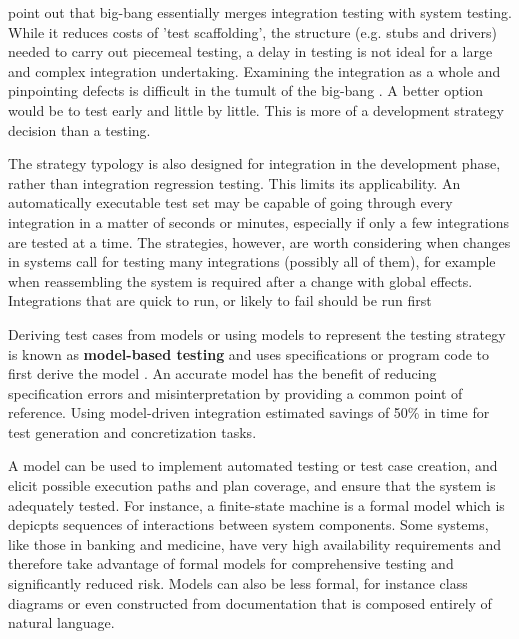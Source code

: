 \documentclass[12pt,a4paper,oneside,pdftex]{report}
\begin{document}
\citet{pezze2008software} point out that big-bang essentially merges integration testing with system testing. While it reduces costs of 'test scaffolding', the structure (e.g. stubs and drivers) needed to carry out piecemeal testing, a delay in testing is not ideal for a large and complex integration undertaking. Examining the integration as a whole and pinpointing defects is difficult in the tumult of the big-bang \citep{myers1976software, pezze2008software}. A better option would be to test early and little by little. This is more of a development strategy decision than a testing.

The strategy typology is also designed for integration in the development phase, rather than integration regression testing. This limits its applicability. An automatically executable test set may be capable of going through every integration in a matter of seconds or minutes, especially if only a few integrations are tested at a time. The strategies, however, are worth considering when changes in systems call for testing many integrations (possibly all of them), for example when reassembling the system is required after a change with global effects. Integrations that are quick to run, or likely to fail should be run first \citep{duvall2007continuous} %

Deriving test cases from models or using models to represent the testing strategy is known as \textbf{model-based testing} and uses specifications or program code to first derive the model \citep{pezze2008software}. An accurate model has the benefit of reducing specification errors and misinterpretation by providing a common point of reference. Using model-driven integration \citet{wieczorek2010model} estimated savings of 50\% in time for test generation and concretization tasks.

A model can be used to implement automated testing or test case creation, and elicit possible execution paths and plan coverage, and ensure that the system is adequately tested. For instance, a finite-state machine is a formal model which is depicpts sequences of interactions between system components. Some systems, like those in banking and medicine, have very high availability requirements and therefore take advantage of formal models for comprehensive testing and significantly reduced risk. Models can also be less formal, for instance class diagrams or even constructed from documentation that is composed entirely of natural language. \citep{pezze2008software}
\end{document}

